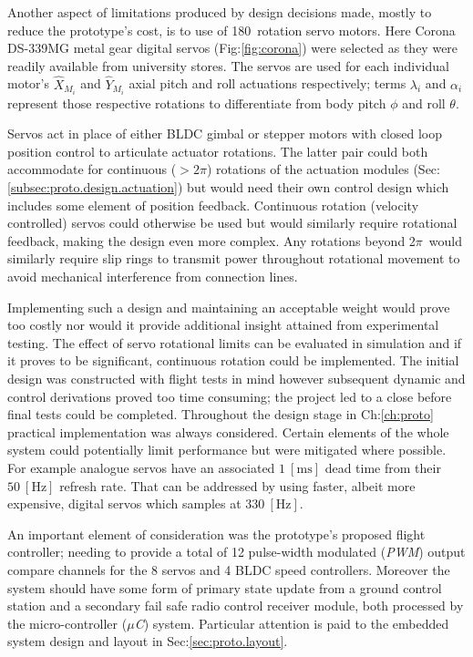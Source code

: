 \par
Another aspect of limitations produced by design decisions made, mostly to reduce the prototype's cost, is to use of 180\textdegree ~rotation servo motors. Here Corona DS-339MG metal gear digital servos (Fig:\ref{fig:corona}) were selected as they were readily available from university stores. The servos are used for each individual motor's $\hat{X}_{M_i}$ and $\hat{Y}_{M_i}$ axial pitch and roll actuations respectively; terms $\lambda_i$ and $\alpha_i$ represent those respective rotations to differentiate from body pitch $\phi$ and roll $\theta$.
\par
Servos act in place of either BLDC gimbal or stepper motors with closed loop position control to articulate actuator rotations. The latter pair could both accommodate for continuous ($>2\pi$) rotations of the actuation modules (Sec:\ref{subsec:proto.design.actuation}) but would need their own control design which includes some element of position feedback. Continuous rotation (velocity controlled) servos could otherwise be used but would similarly require rotational feedback, making the design even more complex. Any rotations beyond 2$\pi$~would similarly require slip rings to transmit power throughout rotational movement to avoid mechanical interference from connection lines. 
\par
Implementing such a design and maintaining an acceptable weight would prove too costly nor would it provide additional insight attained from experimental testing. The effect of servo rotational limits can be evaluated in simulation and if it proves to be significant, continuous rotation could be implemented. The initial design was constructed with flight tests in mind however subsequent dynamic and control derivations proved too time consuming; the project led to a close before final tests could be completed. Throughout the design stage in Ch:\ref{ch:proto} practical implementation was always considered. Certain elements of the whole system could potentially limit performance but were mitigated where possible. For example analogue servos have an associated $1~[\text{ms}]$ dead time from their $50~[\text{Hz}]$ refresh rate. That can be addressed by using faster, albeit more expensive, digital servos which samples at $330~[\text{Hz}]$. 
\par
An important element of consideration was the prototype's proposed flight controller; needing to provide a total of 12 pulse-width modulated (\emph{PWM}) output compare channels for the 8 servos and 4 BLDC speed controllers.  Moreover the system should have some form of primary state update from a ground control station and a secondary fail safe radio control receiver module, both processed by the micro-controller (\emph{$\mu$C}) system. Particular attention is paid to the embedded system design and layout in Sec:\ref{sec:proto.layout}.
\newpage
